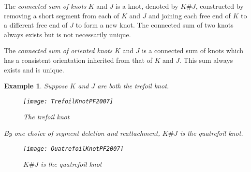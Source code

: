 \documentclass[12pt]{article}
\newcommand{\quatrefoil}{\xygraph{
 !{0;/r2.0pc/:}
 !P3"a"{~>{}}
 !P9"b"{~:{(1.3288,0):}~>{}}
 !P3"c"{~:{(2.5,0):}~>{}} [rrrr]
 !P3"d"{~>{}}
 !P9"e"{~:{(1.3288,0):}~>{}}
 !P3"f"{~:{(2.5,0):}~>{}} [rr]
 !{\vunder~{"b2"}{"b1"}{"a1"}{"a3"}}
 !{\vcap~{"c1"}{"c1"}{"b4"}{"b2"}}
 !{\vunder~{"b5"}{"b4"}{"a2"}{"a1"}}
 !{\vcap~{"c2"}{"c2"}{"b7"}{"b5"}}
 !{\vunder~{"b8"}{"b7"}{"a3"}{"a2"}}
 !{\huntwist~{"b8"}{"e7"}{"b1"}{"e5"}}
 !{\vover~{"e7"}{"e8"}{"d2"}{"d3"}}
 !{\vcap~{"f3"}{"f3"}{"e8"}{"e1"}}
 !{\vover~{"e1"}{"e2"}{"d3"}{"d1"}}
 !{\vcap~{"f1"}{"f1"}{"e2"}{"e4"}}
 !{\vover~{"e4"}{"e5"}{"d1"}{"d2"}}
}}
\newtheorem*{example*}{Example}
\begin{document}
The \emph{connected sum of knots} $K$ and $J$ is a knot, denoted by $K\#J$,
constructed by removing a short segment from each of $K$ and $J$ and joining each free end of $K$ to a different free end of $J$ to form a new knot.  The connected sum of two knots always exists but is not necessarily unique.

The \emph{connected sum of oriented knots} $K$ and $J$ is a connected sum of knots which has a consistent orientation inherited from that of $K$ and $J$.  This sum always exists and is unique.

\begin{example*}
Suppose $K$ and $J$ are both the trefoil knot.
\begin{figure}[here]
  \begin{center}
  \texttt{[image: TrefoilKnotPF2007]}
  \leavevmode
  \end{center}
  \caption{The trefoil knot}
\end{figure}
By one choice of segment deletion and reattachment, $K\#J$ is the quatrefoil knot.
\begin{figure}[here]
  \begin{center}
  \texttt{[image: QuatrefoilKnotPF2007]}
  \leavevmode
  \end{center}
  \caption{$K\#J$ is the quatrefoil knot}
\end{figure}
\end{example*}
\end{document}
